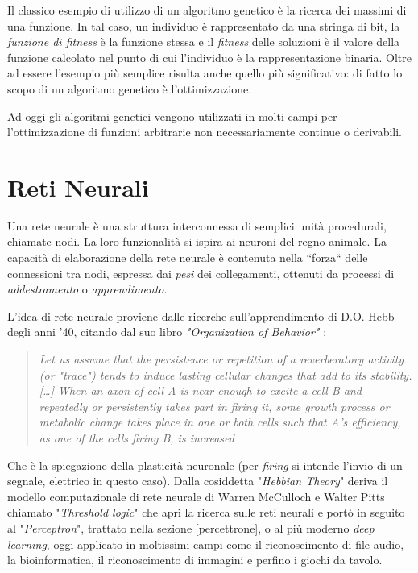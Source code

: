 \documentclass[12pt,a4paper]{report}
\begin{document}
Il classico esempio di utilizzo di un algoritmo genetico è la ricerca dei massimi di una funzione.
In tal caso, un individuo è rappresentato da una stringa di bit, la \textit{funzione di fitness} è la funzione stessa e il \textit{fitness} delle soluzioni è il valore della funzione calcolato nel punto di cui l'individuo è la rappresentazione binaria.
Oltre ad essere l'esempio più semplice risulta anche quello più significativo: di fatto lo scopo di un algoritmo genetico è l'ottimizzazione.  

Ad oggi gli algoritmi genetici vengono utilizzati in molti campi per l'ottimizzazione di funzioni arbitrarie non necessariamente continue o derivabili.

\section{Reti Neurali}

Una rete neurale è una struttura interconnessa di semplici unità procedurali, chiamate nodi. La loro funzionalità si ispira ai neuroni del regno animale. La capacità di elaborazione della rete neurale è contenuta nella ``forza`` delle connessioni tra nodi, espressa dai \textit{pesi} dei collegamenti, ottenuti da processi di \textit{ addestramento} o \textit{apprendimento}. \cite{neural-net-gurney}

L'idea di rete neurale proviene dalle ricerche sull'apprendimento di D.O. Hebb degli anni '40, citando dal suo libro \textit{"Organization of Behavior"} \cite{hebb-learning}:

\begin{quote}
 \begin{center}
  \textit{Let us assume that the persistence or repetition of a reverberatory activity (or "trace") tends to induce lasting cellular changes that add to its stability.[…] When an axon of cell A is near enough to excite a cell B and repeatedly or persistently takes part in firing it, some growth process or metabolic change takes place in one or both cells such that A's efficiency, as one of the cells firing B, is increased}
 \end{center}
\end{quote} 

Che è la spiegazione della plasticità neuronale (per \textit{firing} si intende l'invio di un segnale, elettrico in questo caso).
Dalla cosiddetta "\textit{Hebbian Theory}" deriva il modello computazionale di rete neurale di  Warren McCulloch e Walter Pitts chiamato "\textit{Threshold logic}" che aprì la ricerca sulle reti neurali e portò in seguito al "\textit{Perceptron}", trattato nella sezione \ref{percettrone}, o al più moderno \textit{deep learning},  oggi applicato in moltissimi campi come il riconoscimento di file audio, la bioinformatica, il riconoscimento di immagini e perfino i giochi da tavolo.
\end{document}
